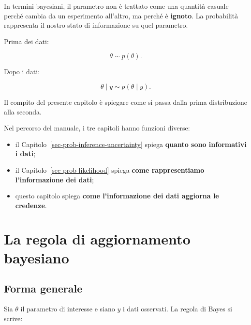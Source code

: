 \documentclass[
  italian,
  letterpaper,
  a4paper,
  11pt,
  open=any]{scrbook}
\providecommand{\tightlist}{%
  \setlength{\itemsep}{0pt}\setlength{\parskip}{0pt}}
\theoremstyle{plain}
\theoremstyle{definition}
\theoremstyle{definition}
\theoremstyle{remark}
\begin{document}
In termini bayesiani, il parametro non è trattato come una quantità
casuale perché cambia da un esperimento all'altro, ma perché è
\textbf{ignoto}. La probabilità rappresenta il nostro stato di
informazione su quel parametro.

Prima dei dati:

\[
\theta \sim p(\theta).
\]

Dopo i dati:

\[
\theta \mid y \sim p(\theta \mid y).
\]

Il compito del presente capitolo è spiegare come si passa dalla prima
distribuzione alla seconda.

\begin{tcolorbox}[enhanced jigsaw, arc=.35mm, bottomrule=.15mm, bottomtitle=1mm, breakable, colback=white, colbacktitle=quarto-callout-note-color!10!white, colframe=quarto-callout-note-color-frame, coltitle=black, left=2mm, leftrule=.75mm, opacityback=0, opacitybacktitle=0.6, rightrule=.15mm, title=\textcolor{quarto-callout-note-color}{\faInfo}\hspace{0.5em}{Tre ruoli distinti}, titlerule=0mm, toprule=.15mm, toptitle=1mm]

Nel percorso del manuale, i tre capitoli hanno funzioni diverse:

\begin{itemize}
\tightlist
\item
  il Capitolo~\ref{sec-prob-inference-uncertainty} spiega \textbf{quanto
  sono informativi i dati};
\item
  il Capitolo~\ref{sec-prob-likelihood} spiega \textbf{come
  rappresentiamo l'informazione dei dati};
\item
  questo capitolo spiega \textbf{come l'informazione dei dati aggiorna
  le credenze}.
\end{itemize}

\end{tcolorbox}

\section{La regola di aggiornamento
bayesiano}\label{sec-bayes-update-rule}

\subsection{Forma generale}\label{forma-generale}

Sia \(\theta\) il parametro di interesse e siano \(y\) i dati osservati.
La regola di Bayes si scrive:
\end{document}
